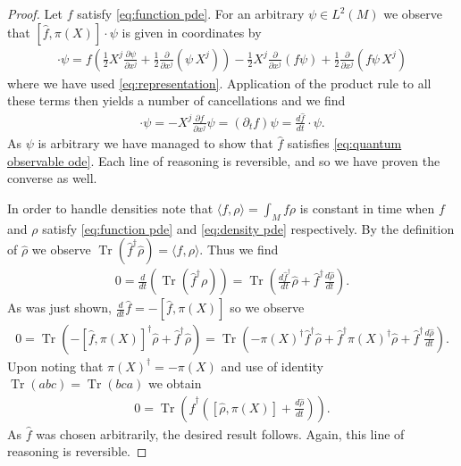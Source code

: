 \documentclass[12pt]{amsart}
\newcommand{\pder}[2]{\ensuremath{\frac{ \partial #1}{\partial #2}}}
\DeclareMathOperator{\Tr}{Tr}
\begin{document}
\begin{proof}
	Let $f$ satisfy \eqref{eq:function pde}.
	For an arbitrary $\psi \in L^{2}(M)$ we observe that $[ \hat{f} , \pi(X)] \cdot \psi$ is given in coordinates by
	\begin{align}
		[ \hat{f} , \pi(X) ] \cdot \psi = f \left( \frac{1}{2} X^{j} \pder{\psi}{x^{j}} + \frac{1}{2} \pder{}{x^{j}} ( \psi \, X^{j} ) \right)
			- \frac{1}{2} X^{j} \pder{}{x^{j}}( f \psi)  + \frac{1}{2} \pder{}{x^{j}} (f \psi \, X^{j} )
	\end{align}
	where we have used \eqref{eq:representation}.  Application of the product rule to all these terms then yields
	a number of cancellations and we find
	\begin{align}
		[ \hat{f} , \pi(X) ] \cdot \psi = - X^{j} \pder{f}{x^{j}} \psi = (\partial_{t} f )\psi = \frac{d \hat{f} }{dt} \cdot \psi.
	\end{align}
	As $\psi$ is arbitrary we have managed to show that $\hat{f}$ satisfies \eqref{eq:quantum observable ode}.
	Each line of reasoning is reversible, and so we have proven the converse as well.
	
	In order to handle densities note that $\langle f , \rho \rangle = \int_{M} f\rho$ is constant in time when $f$
	and $\rho$ satisfy \eqref{eq:function pde} and \eqref{eq:density pde} respectively.
	By the definition of $\hat{\rho}$ we observe $\Tr( \hat{f}^{\dagger} \hat{\rho}) = \langle f , \rho \rangle$.
	Thus we find
	\begin{align}
		0 = \frac{d}{dt} \left( \Tr( \hat{f}^{\dagger} \rho ) \right) = \Tr \left( \frac{d \hat{f}^{\dagger}}{dt} \hat{\rho} + \hat{f}^{\dagger} \frac{d \hat{\rho}}{dt} \right).
	\end{align}
	As was just shown, $\frac{d}{dt} \hat{f} =  - [\hat{f} , \pi(X) ]$ so we observe
	\begin{align}
		0 = \Tr( - [\hat{f} , \pi(X) ]^{\dagger} \hat{\rho} + \hat{f}^{\dagger} \hat{\rho} ) = \Tr( - \pi(X)^{\dagger} \hat{f}^{\dagger} \hat{\rho} + \hat{f}^{\dagger} \pi(X)^{\dagger} \hat{\rho} + \hat{f}^{\dagger} \frac{d\hat{\rho}}{dt} ).
	\end{align}
	Upon noting that $\pi(X)^{\dagger} = - \pi(X)$ and use of identity $\Tr( a b c) = \Tr( bc a)$ we obtain
	\begin{align}
		0 = \Tr \left( \hat{f}^{\dagger}( [\hat{\rho} , \pi(X) ] + \frac{d \hat{\rho}}{dt} ) \right).
	\end{align}
	As $\hat{f}$ was chosen arbitrarily, the desired result follows.
	Again, this line of reasoning is reversible.
	

\end{proof}
\end{document}
